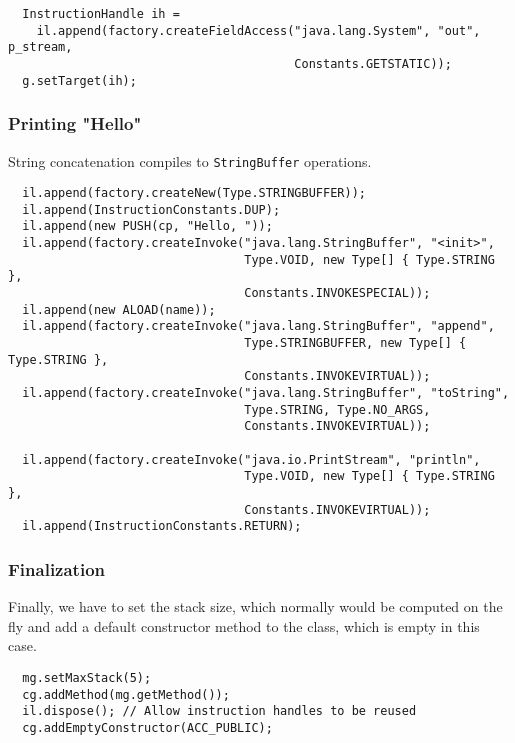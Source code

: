 {\small\begin{verbatim}
  InstructionHandle ih =
    il.append(factory.createFieldAccess("java.lang.System", "out", p_stream,
                                        Constants.GETSTATIC));
  g.setTarget(ih);
\end{verbatim}}

\subsubsection{Printing "Hello"}

String concatenation compiles to \texttt{StringBuffer} operations.

{\small\begin{verbatim}
  il.append(factory.createNew(Type.STRINGBUFFER));
  il.append(InstructionConstants.DUP);
  il.append(new PUSH(cp, "Hello, "));
  il.append(factory.createInvoke("java.lang.StringBuffer", "<init>",
                                 Type.VOID, new Type[] { Type.STRING },
                                 Constants.INVOKESPECIAL));
  il.append(new ALOAD(name));
  il.append(factory.createInvoke("java.lang.StringBuffer", "append",
                                 Type.STRINGBUFFER, new Type[] { Type.STRING },
                                 Constants.INVOKEVIRTUAL));
  il.append(factory.createInvoke("java.lang.StringBuffer", "toString",
                                 Type.STRING, Type.NO_ARGS,
                                 Constants.INVOKEVIRTUAL));
    
  il.append(factory.createInvoke("java.io.PrintStream", "println",
                                 Type.VOID, new Type[] { Type.STRING },
                                 Constants.INVOKEVIRTUAL));
  il.append(InstructionConstants.RETURN);
\end{verbatim}}

\subsubsection{Finalization}

Finally, we  have to  set  the stack  size,  which  normally would  be
computed on the fly and add a default constructor method to the class,
which is empty in this case.

{\small\begin{verbatim}
  mg.setMaxStack(5);
  cg.addMethod(mg.getMethod());
  il.dispose(); // Allow instruction handles to be reused
  cg.addEmptyConstructor(ACC_PUBLIC);
\end{verbatim}}

